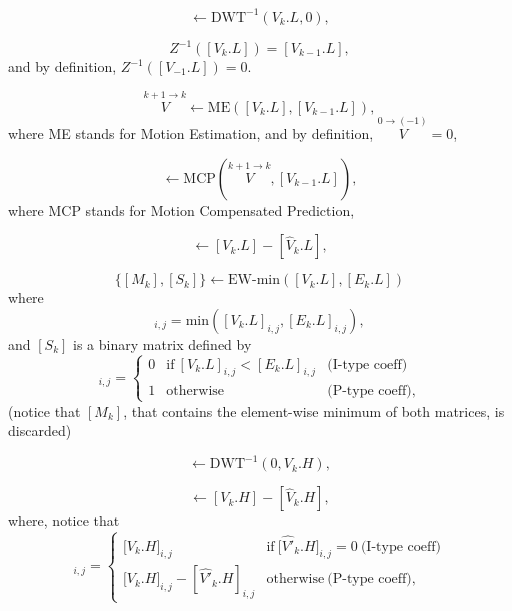 \begin{equation}
  [V_k.L] \leftarrow \text{DWT}^{-1}(V_k.L, 0),
  \tag{E.a}
\end{equation}

\begin{equation}
  Z^{-1}([V_k.L]) = [V_{k-1}.L],
  \tag{E.b}
\end{equation}
and by definition, $Z^{-1}([V_{-1}.L]) = 0$.

\begin{equation}
  \overset{k+1\rightarrow k}{V} \leftarrow \text{ME}([V_k.L], [V_{k-1}.L]),
  \tag{E.c}
\end{equation}
where ME stands for Motion Estimation, and by definition,
$\overset{0\rightarrow (-1)}{V}=0$,

\begin{equation}
  [\hat{V}_k.L] \leftarrow \text{MCP}(\overset{k+1\rightarrow k}{V}, [V_{k-1}.L]),
  \tag{E.d}
\end{equation}
where MCP stands for Motion Compensated Prediction,

\begin{equation}
  [E_k.L] \leftarrow [V_k.L] - [\hat{V}_k.L],
  \tag{E.e}
\end{equation}

\begin{equation}
  \{[M_k],[S_k]\} \leftarrow \text{EW-min}([V_k.L], [E_k.L])
  \tag{E.f}
\end{equation}
where
\begin{equation}
  [M_k]_{i,j}=\text{min}([V_k.L]_{i,j}, [E_k.L]_{i,j}),
\end{equation}
and $[S_k]$ is a binary matrix defined by
\begin{equation}
  [S_k]_{i,j} = \left\{
  \begin{array}{lll}
    0 & \text{if}~[V_k.L]_{i,j} < [E_k.L]_{i,j} & \text{(I-type coeff)} \\
    1 & \text{otherwise}                      & \text{(P-type coeff)},
  \end{array}
  \right.
  \label{eq:matrix}
\end{equation}
(notice that $[M_k]$, that contains the element-wise minimum of both
matrices, is discarded)

\begin{equation}
  [V_k.H] \leftarrow \text{DWT}^{-1}(0, V_k.H),
  \tag{b}
\end{equation}

\begin{equation}
  [E_k.H] \leftarrow [V_k.H] - [\hat{V}_k.H],
  \tag{c}
\end{equation}
where, notice that
\begin{equation}
  [E_k.H]_{i,j} = \left\{
  \begin{array}{ll}
    {[}V_k.H{]}_{i,j}                       & \text{if}~{[}\hat{V'}_k.H{]}_{i,j} = 0~\text{(I-type coeff)} \\
    {[}V_k.H{]}_{i,j} - [\hat{V'}_k.H]_{i,j} & \text{otherwise}~\text{(P-type coeff)},
  \end{array}
\right.
\end{equation}


